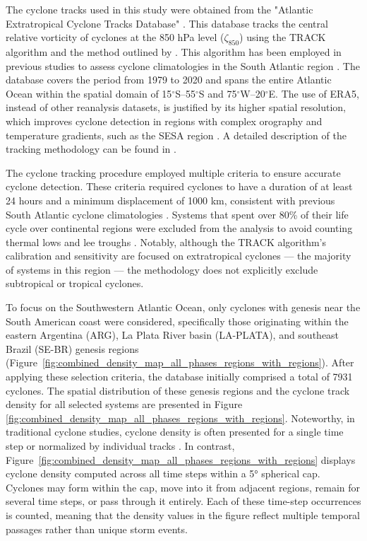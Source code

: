 \documentclass[pdflatex,sn-chicago]{sn-jnl}%
\theoremstyle{plain}
\theoremstyle{definition}
\theoremstyle{remark}
\theoremstyle{definition}
\begin{document}
The cyclone tracks used in this study were obtained from the "Atlantic Extratropical Cyclone Tracks Database" \citep{gramcianinov2020data}. This database tracks the central relative vorticity of cyclones at the 850 hPa level (\(\zeta_{850}\)) using the TRACK algorithm \citep{hodges1994general, hodges1995feature} and the method outlined by \citet{hoskins2002new}. This algorithm has been employed in previous studies to assess cyclone climatologies in the South Atlantic region \citep{gramcianinov2019properties,gramcianinov2020analysis,couto2024new}. The database covers the period from 1979 to 2020 and spans the entire Atlantic Ocean within the spatial domain of 15\(^\circ\)S–55\(^\circ\)S and 75\(^\circ\)W–20\(^\circ\)E. The use of ERA5, instead of other reanalysis datasets, is justified by its higher spatial resolution, which improves cyclone detection in regions with complex orography and temperature gradients, such as the SESA region \citep{gramcianinov2020analysis}. A detailed description of the tracking methodology can be found in \citet{gramcianinov2020analysis}.

The cyclone tracking procedure employed multiple criteria to ensure accurate cyclone detection. These criteria required cyclones to have a duration of at least 24 hours and a minimum displacement of 1000 km, consistent with previous South Atlantic cyclone climatologies \citep{sinclair1995climatology,gramcianinov2019properties}. Systems that spent over 80\% of their life cycle over continental regions were excluded from the analysis to avoid counting thermal lows and lee troughs \citep[e.g.][]{crespo2021potential}. Notably, although the TRACK algorithm's calibration and sensitivity are focused on extratropical cyclones — the majority of systems in this region \citep{marrafon2022classificaccao} — the methodology does not explicitly exclude subtropical or tropical cyclones.  

To focus on the Southwestern Atlantic Ocean, only cyclones with genesis near the South American coast were considered, specifically those originating within the eastern Argentina (ARG), La Plata River basin (LA-PLATA), and southeast Brazil (SE-BR) genesis regions \citep{gramcianinov2019properties,couto2024new} (Figure~\ref{fig:combined_density_map_all_phases_regions_with_regions}). After applying these selection criteria, the database initially comprised a total of 7931 cyclones. The spatial distribution of these genesis regions and the cyclone track density for all selected systems are presented in Figure \ref{fig:combined_density_map_all_phases_regions_with_regions}. Noteworthy, in traditional cyclone studies, cyclone density is often presented for a single time step or normalized by individual tracks \citep[e.g.,][]{hoskins2005new,gramcianinov2019properties}. In contrast, Figure~\ref{fig:combined_density_map_all_phases_regions_with_regions} displays cyclone density computed across all time steps within a 5° spherical cap. Cyclones may form within the cap, move into it from adjacent regions, remain for several time steps, or pass through it entirely. Each of these time-step occurrences is counted, meaning that the density values in the figure reflect multiple temporal passages rather than unique storm events.
\end{document}

